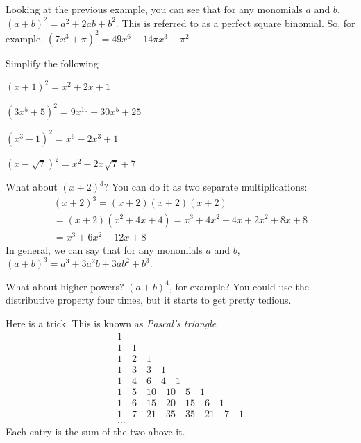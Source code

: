 Looking at the previous example, you can see that for any monomials $a$ and $b$,  
$(a + b)^2 = a^2 + 2ab + b^2.$ This is referred to as a perfect square binomial. 
So, for example, $(7x^3 + \pi)^2 = 49x^6 + 14\pi x^3 + \pi^2$

\begin{Exercise}[title={Squaring binomials}, label=squaringbinomials]
  Simplify the following
  
\end{Exercise}
\begin{Answer}[ref=squaringbinomials]
  $(x+1)^2 = x^2 + 2x + 1$

  $(3x^5 + 5)^2 = 9x^{10} + 30x^5 + 25$

  $(x^3 - 1)^2 = x^6 - 2x^3 + 1$

  $(x - \sqrt{7})^2 = x^2 - 2x\sqrt{7} + 7$
\end{Answer}

What about $(x + 2)^3$? You can do it as two separate multiplications:
\begin{multline*}
  (x+2)^3 = (x+2)(x+2)(x+2) \\
  = (x + 2)(x^2 + 4x + 4) = x^3 + 4x^2 + 4x + 2x^2 + 8x + 8 \\
  = x^3 + 6x^2 + 12x + 8
\end{multline*}
In general, we can say that for any monomials $a$ and $b$, $(a + b)^3 = a^3 + 3a^2b + 3ab^2 + b^3$.

What about higher powers? $(a + b)^4$, for example? You could use the
distributive property four times, but it starts to get pretty tedious.

Here is a trick. This is known as \emph{Pascal's triangle}
\begin{equation*}
\begin{array}{c}
 1 \\
 1 \quad 1 \\
 1 \quad 2 \quad 1 \\
 1 \quad 3 \quad 3 \quad 1 \\
 1 \quad 4 \quad 6 \quad 4 \quad 1 \\
 1 \quad 5 \quad 10 \quad 10 \quad 5 \quad 1 \\
 1 \quad 6 \quad 15 \quad 20 \quad 15 \quad 6 \quad 1 \\
 1 \quad 7 \quad 21 \quad 35 \quad 35 \quad 21 \quad 7 \quad 1 \\
 \ldots
\end{array}
\end{equation*}
Each entry is the sum of the two above it.

